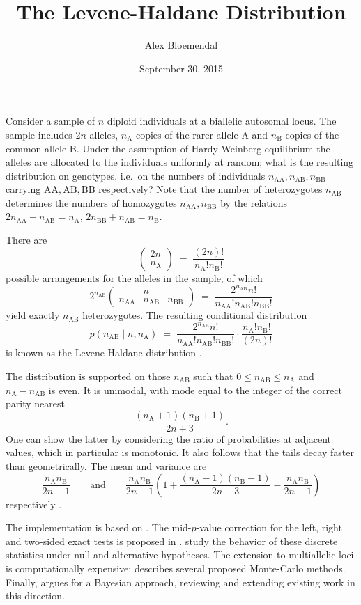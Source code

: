 \documentclass[letterpaper, 10pt]{article}
\title{The Levene-Haldane Distribution}
\author{Alex Bloemendal}
\date{September 30, 2015}
\newcommand{\1}{\mathbf{1}}
\newcommand{\A}{\mathrm A}
\newcommand{\B}{\mathrm B}
\theoremstyle{plain}
\theoremstyle{definition}
\theoremstyle{remark}
\begin{document}
\maketitle
\thispagestyle{empty}

Consider a sample of $n$ diploid individuals at a biallelic autosomal locus. The sample includes $2n$ alleles, $n_\A$ copies of the rarer allele A and $n_\B$ copies of the common allele B. Under the assumption of Hardy-Weinberg equilibrium the alleles are allocated to the individuals uniformly at random; what is the resulting distribution on genotypes, i.e.\ on the numbers of individuals $n_{\A\A}, n_{\A\B}, n_{\B\B}$ carrying  $\A\A, \A\B, \B\B$ respectively? Note that the number of heterozygotes $n_{\A\B}$ determines the numbers of homozygotes $n_{\A\A}, n_{\B\B}$ by the relations $2n_{\A\A} + n_{\A\B} = n_\A$, $2n_{\B\B} + n_{\A\B} = n_\B$.

There are
\[
\begin{pmatrix}
2n\\
n_{\A}
\end{pmatrix}
\;=\; \frac{(2n)!}{n_{\A}! n_{\B}!}
\]
possible arrangements for the alleles in the sample, of which
\[
2^{n_{\A\B}}
\begin{pmatrix}
& n &\\
n_{\A\A} & n_{\A\B} & n_{\B\B}
\end{pmatrix} \;=\;
\frac{2^{n_{\A\B}} n!}{n_{\A\A}! n_{\A\B}!  n_{\B\B}!}
\]
yield exactly $n_{\A\B}$ heterozygotes. The resulting conditional distribution
\[
p(n_{\A\B} \mid n, n_\A) \; = \; \frac{2^{n_{\A\B}} n!}{n_{\A\A}! n_{\A\B}!  n_{\B\B}!}\cdot\frac{n_{\A}! n_{\B}!}{(2n)!}
\]
is known as the Levene-Haldane distribution \citep{Weir, HWE_Wigginton, HWE_Graffelman}.

The distribution is supported on those $n_{\A\B}$ such that $0\le n_{\A\B}\le n_\A$ and $n_\A - n_{\A\B}$ is even. It is unimodal, with mode equal to the integer of the correct parity nearest
\[
\frac{(n_\A + 1)(n_\B + 1)}{2n + 3}.
\]
One can show the latter by considering the ratio of probabilities at adjacent values, which in particular is monotonic. It also follows that the tails decay faster than geometrically. The mean and variance are
\[
\frac{n_\A n_\B}{2n - 1} \qquad \text{and}\qquad \frac{n_\A n_\B}{2n - 1}\left(1 + \frac{(n_\A - 1)(n_\B - 1)}{2n - 3}  - \frac{n_\A n_\B}{2n - 1}\right)
\]
respectively \citep{HWE_Okamoto}.

The implementation is based on \cite{HWE_Wigginton}. The mid-$p$-value correction for the left, right and two-sided exact tests is proposed in \cite{HWE_Graffelman}. \cite{HWE_Rohlfs} study the behavior of these discrete statistics under null and alternative hypotheses. The extension to multiallelic loci is computationally expensive; \cite{HWE_Engels} describes several proposed Monte-Carlo methods. Finally, \cite{HWE_Wakefield} argues for a Bayesian approach, reviewing and extending existing work in this direction.

\bigskip


\end{document}
